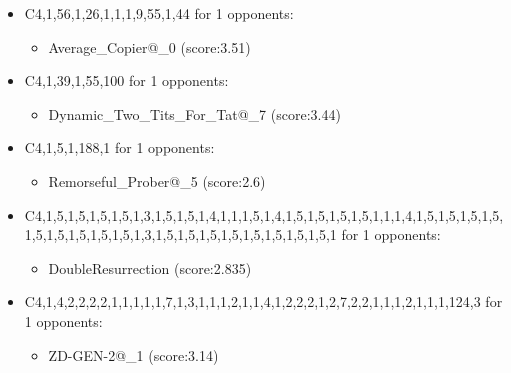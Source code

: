 \begin{appendices}
\begin{itemize}
        \item C4,1,56,1,26,1,1,1,9,55,1,44 for 1 opponents:
        \begin{multicols}{3}
            \begin{itemize}
                \item Average\_Copier@\_0 (score:3.51)
            \end{itemize}
        \end{multicols}

        \item C4,1,39,1,55,100 for 1 opponents:
        \begin{multicols}{3}
            \begin{itemize}
                \item Dynamic\_Two\_Tits\_For\_Tat@\_7 (score:3.44)
            \end{itemize}
        \end{multicols}

        \item C4,1,5,1,188,1 for 1 opponents:
        \begin{multicols}{3}
            \begin{itemize}
                \item Remorseful\_Prober@\_5 (score:2.6)
            \end{itemize}
        \end{multicols}

        \item C4,1,5,1,5,1,5,1,5,1,3,1,5,1,5,1,4,1,1,1,5,1,4,1,5,1,5,1,5,1,5,1,1,1,4,1,5,1,5,1,5,1,5,1,5,1,5,1,5,1,5,1,5,1,3,1,5,1,5,1,5,1,5,1,5,1,5,1,5,1,5,1 for 1 opponents:
        \begin{multicols}{3}
            \begin{itemize}
                \item DoubleResurrection (score:2.835)
            \end{itemize}
        \end{multicols}

        \item C4,1,4,2,2,2,2,1,1,1,1,1,7,1,3,1,1,1,2,1,1,4,1,2,2,2,1,2,7,2,2,1,1,1,2,1,1,1,124,3 for 1 opponents:

        \begin{multicols}{3}
            \begin{itemize}
                \item ZD-GEN-2@\_1 (score:3.14)
            \end{itemize}
        \end{multicols}


\end{itemize}
\end{appendices}
